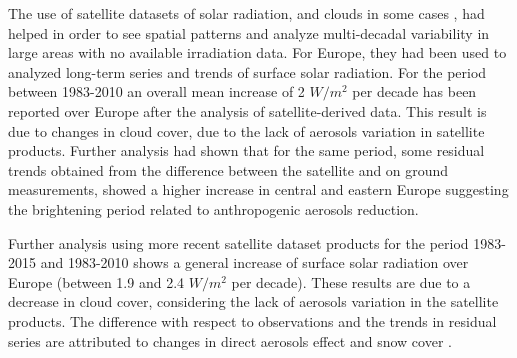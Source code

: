 The use of satellite datasets of solar radiation, and clouds in some cases \cite*{Pfeifroth2017}, had helped in order to see spatial patterns and analyze multi-decadal variability in large areas with no available irradiation data. For Europe, they had been used to analyzed long-term series and trends of surface solar radiation. For the period between 1983-2010 an overall mean increase of 2 $W/m^2$ per decade has been reported over Europe after the analysis of satellite-derived data. This result is due to changes in cloud cover, due to the lack of aerosols variation in satellite products. Further analysis had shown that for the same period, some residual trends obtained from the difference between the satellite and on ground measurements, showed a higher increase in central and eastern Europe suggesting the brightening period related to anthropogenic aerosols reduction.

Further analysis using more recent satellite dataset products for the period 1983-2015 and 1983-2010 shows a general increase of surface solar radiation over Europe (between 1.9 and 2.4 $W/m^2$ per decade). These results are  due to a decrease in cloud cover, considering the lack of aerosols variation in the satellite products. The difference with respect to observations and the trends in residual series are attributed to changes in direct aerosols effect and snow cover \cite*{Pfeifroth2018, Sanchez-Lorenzo2017}. 









